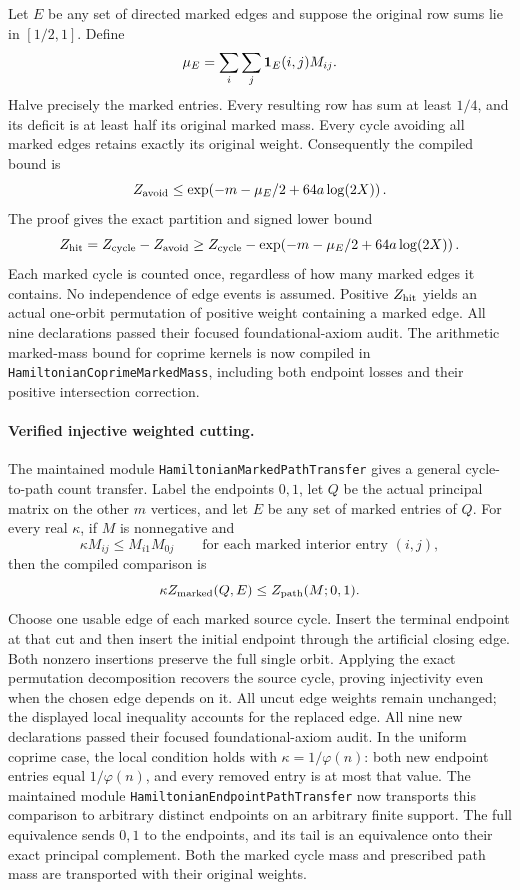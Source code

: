 Let \(E\) be any set of directed marked edges and suppose the
original row sums lie in \([1/2,1]\). Define
\[
 \mu_E=\sum_i\sum_j {\bf1}_{E}(i,j)M_{ij}.
\]
Halve precisely the marked entries. Every resulting row has sum
at least \(1/4\), and its deficit is at least half its original
marked mass. Every cycle avoiding all marked edges retains
exactly its original weight. Consequently the compiled bound is
\[
 Z_{\rm avoid}
 \leq\exp\!\left(-m-\mu_E/2+64a\log(2X)\right).
\]
The proof gives the exact partition and signed lower bound
\[
 Z_{\rm hit}=Z_{\rm cycle}-Z_{\rm avoid}
 \geq Z_{\rm cycle}
       -\exp\!\left(-m-\mu_E/2+64a\log(2X)\right).
\]
Each marked cycle is counted once, regardless of how many marked
edges it contains. No independence of edge events is assumed.
Positive \(Z_{\rm hit}\) yields an actual one-orbit permutation
of positive weight containing a marked edge.
All nine declarations passed their focused foundational-axiom audit.
The arithmetic marked-mass bound for coprime kernels is now compiled
in \texttt{HamiltonianCoprimeMarkedMass}, including both endpoint
losses and their positive intersection correction.

\paragraph{Verified injective weighted cutting.}
The maintained module \texttt{HamiltonianMarkedPathTransfer} gives
a general cycle-to-path count transfer. Label the endpoints \(0,1\),
let \(Q\) be the actual principal matrix on the other \(m\) vertices,
and let \(E\) be any set of marked entries of \(Q\).
For every real \(\kappa\), if \(M\) is nonnegative and
\[
 \kappa M_{ij}\leq M_{i1}M_{0j}
       \qquad\text{for each marked interior entry }(i,j),
\]
then the compiled comparison is
\[
 \kappa Z_{\rm marked}(Q,E)\leq Z_{\rm path}(M;0,1).
\]
Choose one usable edge of each marked source cycle.
Insert the terminal endpoint at that cut and then insert the
initial endpoint through the artificial closing edge.
Both nonzero insertions preserve the full single orbit.
Applying the exact permutation decomposition recovers the source
cycle, proving injectivity even when the chosen edge depends on it.
All uncut edge weights remain unchanged; the displayed local
inequality accounts for the replaced edge.
All nine new declarations passed their focused foundational-axiom audit.
In the uniform coprime case, the local condition holds with
\(\kappa=1/\varphi(n)\): both new endpoint entries equal
\(1/\varphi(n)\), and every removed entry is at most that value.
The maintained module \texttt{HamiltonianEndpointPathTransfer}
now transports this comparison to arbitrary distinct endpoints on
an arbitrary finite support. The full equivalence sends \(0,1\)
to the endpoints, and its tail is an equivalence onto their exact
principal complement. Both the marked cycle mass and prescribed
path mass are transported with their original weights.

